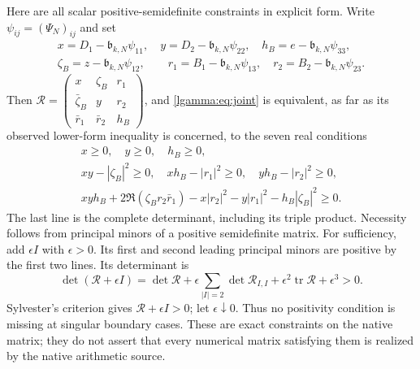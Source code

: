 \documentclass[11pt]{article}
\begin{document}
Here are all scalar positive-semidefinite constraints in explicit form.
Write $\psi_{ij}=(\Psi_N)_{ij}$ and set
\begin{equation}\label{lgamma:eq:resentries}
 \begin{gathered}
 x=D_1-\mathfrak b_{k,N}\psi_{11},\quad
 y=D_2-\mathfrak b_{k,N}\psi_{22},\quad
 h_B=e-\mathfrak b_{k,N}\psi_{33},\\
 \zeta_B=z-\mathfrak b_{k,N}\psi_{12},\qquad
 r_1=B_1-\mathfrak b_{k,N}\psi_{13},\quad
 r_2=B_2-\mathfrak b_{k,N}\psi_{23}.
 \end{gathered}
\end{equation}
Then $\mathcal R=\left(\begin{smallmatrix}
x&\zeta_B&r_1\\\bar\zeta_B&y&r_2\\\bar r_1&\bar r_2&h_B
\end{smallmatrix}\right)$, and \eqref{lgamma:eq:joint} is equivalent, as far
as its observed lower-form inequality is concerned, to the seven real
conditions
\begin{equation}\label{lgamma:eq:allminors}
 \boxed{\begin{gathered}
 x\ge0,\quad y\ge0,\quad h_B\ge0,\\
 xy-|\zeta_B|^2\ge0,\quad xh_B-|r_1|^2\ge0,
 \quad yh_B-|r_2|^2\ge0,\\
 xyh_B+2\Re(\zeta_Br_2\bar r_1)
 -x|r_2|^2-y|r_1|^2-h_B|\zeta_B|^2\ge0.
 \end{gathered}}
\end{equation}
The last line is the complete determinant, including its triple product.
Necessity follows from principal minors of a positive semidefinite
matrix.  For sufficiency, add $\epsilon I$ with $\epsilon>0$.
Its first and second leading principal minors are positive by the
first two lines.  Its determinant is
\[
 \det(\mathcal R+\epsilon I)
 =\det\mathcal R+
 \epsilon\sum_{|I|=2}\det\mathcal R_{I,I}
 +\epsilon^2\operatorname{tr}\mathcal R+\epsilon^3>0.
\]
Sylvester's criterion gives
$\mathcal R+\epsilon I>0$; let $\epsilon\downarrow0$.
Thus no positivity condition is missing at singular boundary cases.
These are exact constraints on the native matrix; they do not assert
that every numerical matrix satisfying them is realized by the native
arithmetic source.
\end{document}
